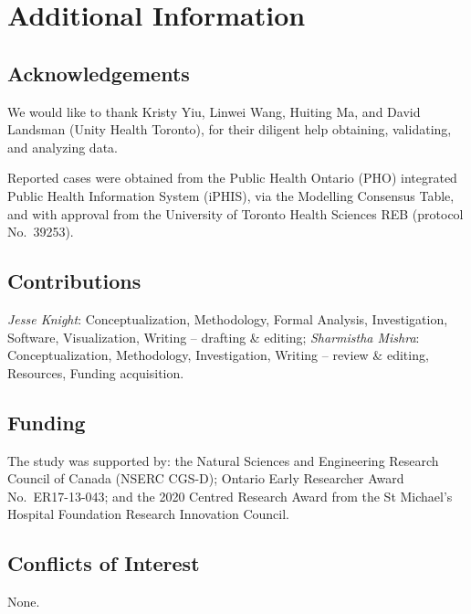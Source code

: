 \section*{Additional Information}
\subsection*{Acknowledgements}
We would like to thank
Kristy Yiu, Linwei Wang, Huiting Ma, and David Landsman (Unity Health Toronto),
for their diligent help obtaining, validating, and analyzing \covid data.
\par
Reported \covid cases were obtained
from the Public Health Ontario (PHO) integrated Public Health Information System (iPHIS),
via the \covid Modelling Consensus Table,
and with approval from the University of Toronto Health Sciences REB (protocol No.\ 39253).
\subsection*{Contributions}
\emph{Jesse Knight}:
  Conceptualization,
  Methodology,
  Formal Analysis,
  Investigation,
  Software,
  Visualization,
  Writing -- drafting \& editing;
\emph{Sharmistha Mishra}:
  Conceptualization,
  Methodology,
  Investigation,
  Writing -- review \& editing,
  Resources,
  Funding acquisition.
\subsection*{Funding}
The study was supported by:
the Natural Sciences and Engineering Research Council of Canada (NSERC CGS-D);
Ontario Early Researcher Award No.\ ER17-13-043; and
the 2020 \covid Centred Research Award from the St Michael's Hospital Foundation Research Innovation Council.
\subsection*{Conflicts of Interest}
None.
